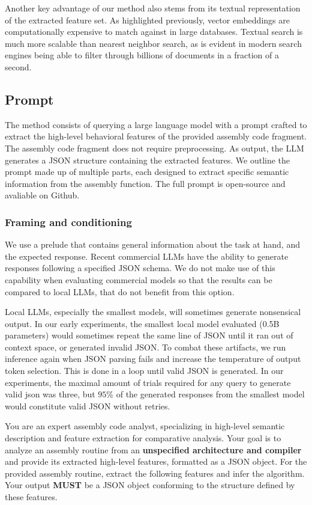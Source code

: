 \documentclass[conference,compsoc]{IEEEtran}
\begin{document}
Another key advantage of our method also stems from its textual representation of the extracted feature set. As highlighted
previously, vector embeddings are computationally expensive to match against in large databases. Textual search is much
more scalable than nearest neighbor search, as is evident in modern search engines being able to filter through billions of documents
in a fraction of a second.

\subsection{Prompt}

The method consists of querying a large language model with a prompt crafted to extract the high-level behavioral features of
the provided assembly code fragment. The assembly code fragment does not require preprocessing. As output, the LLM generates a JSON
structure containing the extracted features. We outline the prompt made up of multiple parts, each designed to
extract specific semantic information from the assembly function. The full prompt is open-source and avaliable on Github.

\subsubsection{Framing and conditioning}

We use a prelude that contains general information about the task at hand, and the expected response.
Recent commercial LLMs have the ability to generate responses following a specified JSON schema. We do not
make use of this capability when evaluating commercial models so that the results can be compared to local LLMs,
that do not benefit from this option.

Local LLMs, especially the smallest models, will sometimes generate nonsensical output. In our early experiments, the smallest local model
evaluated (0.5B parameters) would sometimes repeat the same line of JSON until it ran out of context space, or generated invalid JSON.
To combat these artifacts, we run inference again when JSON parsing fails and increase the temperature of output token
selection. This is done in a loop until valid JSON is generated. In our experiments, the maximal amount of trials required
for any query to generate valid json was three, but \(95\%\) of the generated responses from the smallest model would constitute
valid JSON without retries.

\begin{tcolorbox}
You are an expert assembly code analyst, specializing in high-level semantic description and feature extraction for comparative
analysis. Your goal is to analyze an assembly routine from an \textbf{unspecified architecture and compiler} and provide its extracted
high-level features, formatted as a JSON object. For the provided assembly routine, extract the following features and infer the
algorithm. Your output \textbf{MUST} be a JSON object conforming to the structure defined by these features.
\end{tcolorbox}
\end{document}
